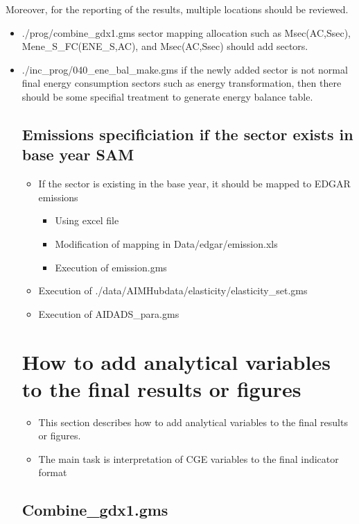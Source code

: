 \documentclass[10pt,a4paper,titlepage,dvipdfmx]{book}
\begin{document}
Moreover, for the reporting of the results, multiple locations should be reviewed.
\begin{itemize}
  \item ./prog/combine\_gdx1.gms
  sector mapping allocation such as Msec(AC,Ssec), Mene_S_FC(ENE_S,AC), and Msec(AC,Ssec) should add sectors.
  \item ./inc\_prog/040\_ene\_bal\_make.gms
  if the newly added sector is not normal final energy consumption sectors such as energy transformation, then there should be some specifial treatment to generate energy balance table. 


\subsection{\label{subsec:EssPro}Emissions specificiation if the sector exists in base year SAM}

\begin{itemize}
\item If the sector is existing in the base year, it should be mapped to EDGAR emissions
\begin{itemize}
\item Using excel file
\item Modification of mapping in Data/edgar/emission.xls
\item Execution of emission.gms
\end{itemize}

\item Execution of ./data/AIMHubdata/elasticity/elasticity\_set.gms
\item Execution of AIDADS\_para.gms
\end{itemize}


\section{\label{sec:HowAddAnaVarFinRes}How to add analytical variables to the final results or figures}


\begin{itemize}
\item This section describes how to add analytical variables to the final results or figures.
\item The main task is interpretation of CGE variables to the final indicator format
\end{itemize}
\subsection{\label{subsec:Com1}Combine\_gdx1.gms}



\end{itemize}
\end{document}
